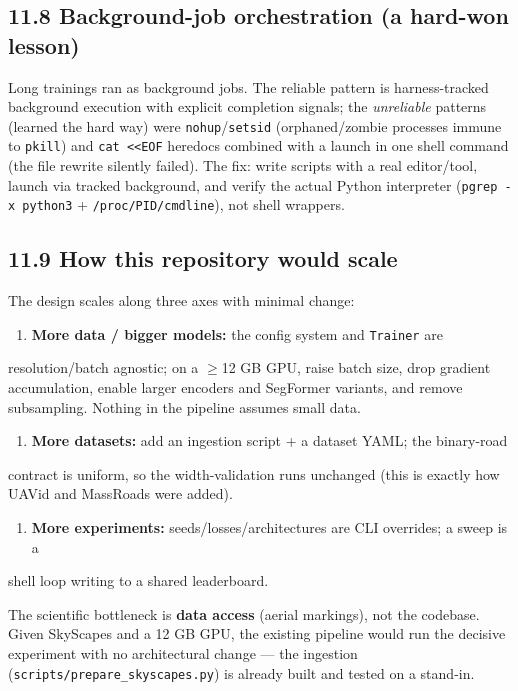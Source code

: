 \documentclass[11pt]{article}
\begin{document}
\subsection*{11.8 Background-job orchestration (a hard-won lesson)}

Long trainings ran as background jobs. The reliable pattern is harness-tracked background execution with explicit completion signals; the \textit{unreliable} patterns (learned the hard way) were \texttt{nohup}/\texttt{setsid} (orphaned/zombie processes immune to \texttt{pkill}) and \texttt{cat <<EOF} heredocs combined with a launch in one shell command (the file rewrite silently failed). The fix: write scripts with a real editor/tool, launch via tracked background, and verify the actual Python interpreter (\texttt{pgrep -x python3} + \texttt{/proc/PID/cmdline}), not shell wrappers.

\subsection*{11.9 How this repository would scale}

The design scales along three axes with minimal change:

\begin{enumerate}\setlength{\itemsep}{1pt}
\item \textbf{More data / bigger models:} the config system and \texttt{Trainer} are
\end{enumerate}
   resolution/batch agnostic; on a $\geq$12 GB GPU, raise batch size, drop gradient    accumulation, enable larger encoders and SegFormer variants, and remove    subsampling. Nothing in the pipeline assumes small data.
\begin{enumerate}\setlength{\itemsep}{1pt}
\item \textbf{More datasets:} add an ingestion script + a dataset YAML; the binary-road
\end{enumerate}
   contract is uniform, so the width-validation runs unchanged (this is exactly how    UAVid and MassRoads were added).
\begin{enumerate}\setlength{\itemsep}{1pt}
\item \textbf{More experiments:} seeds/losses/architectures are CLI overrides; a sweep is a
\end{enumerate}
   shell loop writing to a shared leaderboard.

The scientific bottleneck is \textbf{data access} (aerial markings), not the codebase. Given SkyScapes and a 12 GB GPU, the existing pipeline would run the decisive experiment with no architectural change --- the ingestion (\texttt{scripts/prepare\_skyscapes.py}) is already built and tested on a stand-in.
\end{document}

